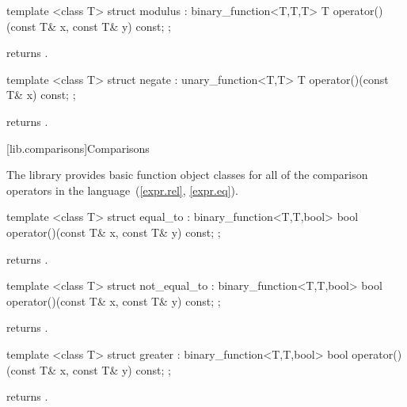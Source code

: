 %
\begin{itemdecl}
template <class T> struct modulus : binary_function<T,T,T> {
  T operator()(const T& x, const T& y) const;
};
\end{itemdecl}

\begin{itemdescr}
\pnum
{} returns .
\end{itemdescr}

%
\begin{itemdecl}
template <class T> struct negate : unary_function<T,T> {
  T operator()(const T& x) const;
};
\end{itemdecl}

\begin{itemdescr}
\pnum
{} returns .
\end{itemdescr}

[lib.comparisons]{Comparisons}

\pnum
The library provides basic function object classes for all of the comparison
operators in the language~(\ref{expr.rel}, \ref{expr.eq}).

%
\begin{itemdecl}
template <class T> struct equal_to : binary_function<T,T,bool> {
  bool operator()(const T& x, const T& y) const;
};
\end{itemdecl}

\begin{itemdescr}
\pnum
{} returns .
\end{itemdescr}

%
\begin{itemdecl}
template <class T> struct not_equal_to : binary_function<T,T,bool> {
  bool operator()(const T& x, const T& y) const;
};
\end{itemdecl}

\begin{itemdescr}
\pnum
{} returns .
\end{itemdescr}

%
\begin{itemdecl}
template <class T> struct greater : binary_function<T,T,bool> {
  bool operator()(const T& x, const T& y) const;
};
\end{itemdecl}

\begin{itemdescr}
\pnum
{} returns .
\end{itemdescr}

